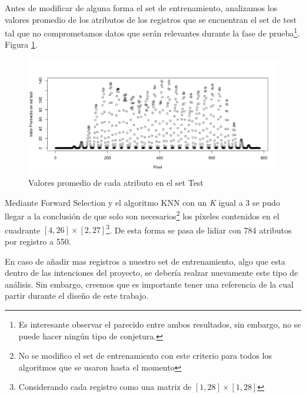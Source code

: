 Antes de modificar de alguna forma el set de entrenamiento, analizamos los valores promedio de los atributos de los registros que se encuentran el set de test tal que no comprometamos datos que serán relevantes durante la fase de prueba\footnote{Es interesante observar el parecido entre ambos resultados, sin embargo, no se puede hacer ningún tipo de conjetura.}. Figura \ref{plot2}.

\begin{figure}[htp]
  \begin{center}
    \includegraphics[width=15cm]{Rplot01.jpeg}
    \caption{Valores promedio de cada atributo en el set Test}
    \label{plot2}
  \end{center}
\end{figure}

Mediante Forward Selection y el algoritmo KNN con un \textit{K} igual a 3 se pudo llegar a la conclusión de que solo son necesarios\footnote{No se modifico el set de entrenamiento con este criterio para todos los algoritmos que se usaron hasta el momento} los píxeles contenidos en el cuadrante $ [4,26]\times[2,27] $\footnote{Considerando cada registro como una matriz de $ [1,28]\times[1,28] $}. De esta forma se pasa de lidiar con 784 atributos por registro a 550.

En caso de añadir mas registros a nuestro set de entrenamiento, algo que esta dentro de las intenciones del proyecto, se debería realzar nuevamente este tipo de análisis. Sin embargo, creemos que es importante tener una referencia de la cual partir durante el diseño de este trabajo.
